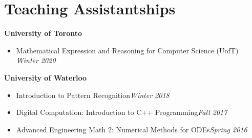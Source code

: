 \section*{Teaching Assistantships}
    \vspace{\postsubhead}
    \textbf{University of Toronto}
      \begin{itemize}
        \setlength\itemsep{0.1em}
        \item Mathematical Expression and Reasoning for Computer Science (UofT)
          \hfill
      	 \textit{Winter 2020}
      \end{itemize}
    \vspace{\interlist}
    \textbf{University of Waterloo}
      \begin{itemize}
        \setlength\itemsep{0.1em}
        \item Introduction to Pattern Recognition\hfill\textit{Winter 2018}
        \item Digital Computation: Introduction to C++ Programming\hfill\textit{Fall 2017}
        \item Advanced Engineering Math 2: Numerical Methods for ODEs\hfill\textit{Spring 2016}
      \end{itemize}
   \vspace{\interlist}
